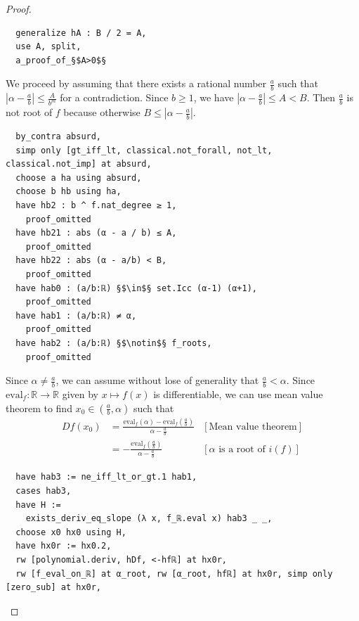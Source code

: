 \documentclass{report}
\theoremstyle{definition}
\begin{document}
\begin{proof}
\begin{verbatim}
  generalize hA : B / 2 = A,
  use A, split,
  a_proof_of_§$A>0$§
\end{verbatim}

We proceed by assuming that there exists a rational number $\frac a b$ such that $\left|\alpha-\frac a b\right|\le\frac A{b^m}$ for a contradiction. Since $b\ge 1$, we have $\left|\alpha-\frac ab\right|\le A < B$. Then $\frac a b$ is not root of $f$ because otherwise $B\le \left|\alpha-\frac ab\right|$.

\begin{verbatim}
  by_contra absurd, 
  simp only [gt_iff_lt, classical.not_forall, not_lt, classical.not_imp] at absurd,
  choose a ha using absurd,
  choose b hb using ha,                               
  have hb2 : b ^ f.nat_degree ≥ 1,
    proof_omitted
  have hb21 : abs (α - a / b) ≤ A, 
    proof_omitted
  have hb22 : abs (α - a/b) < B,
    proof_omitted
  have hab0 : (a/b:ℝ) §$\in$§ set.Icc (α-1) (α+1),
    proof_omitted
  have hab1 : (a/b:ℝ) ≠ α,
    proof_omitted
  have hab2 : (a/b:ℝ) §$\notin$§ f_roots,
    proof_omitted
\end{verbatim}

Since $\alpha\ne \frac a b$, we can assume without lose of generality that $\frac a b < \alpha$. Since $\mathrm{eval}_f:\mathbb R\to \mathbb R$ given by $x\mapsto f(x)$ is differentiable, we can use mean value theorem to find $x_0\in(\frac ab, \alpha)$ such that 
\begin{equation*}
\begin{aligned}
  Df(x_0)&=\frac{\mathrm{eval}_f(\alpha)-\mathrm{eval}_f(\frac ab)}{\alpha-\frac ab} & [\text{Mean value theorem}]\\
         &=-\frac{\mathrm{eval}_f(\frac ab)}{\alpha-\frac ab} & [\alpha\text{ is a root of } i(f)]
\end{aligned}
\end{equation*}

\begin{verbatim}
  have hab3 := ne_iff_lt_or_gt.1 hab1,
  cases hab3,
  have H := 
    exists_deriv_eq_slope (λ x, f_ℝ.eval x) hab3 _ _, 
  choose x0 hx0 using H,
  have hx0r := hx0.2,
  rw [polynomial.deriv, hDf, <-hfℝ] at hx0r,
  rw [f_eval_on_ℝ] at α_root, rw [α_root, hfℝ] at hx0r, simp only [zero_sub] at hx0r,
\end{verbatim}


\end{proof}
\end{document}
